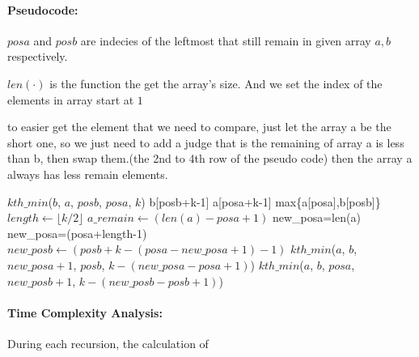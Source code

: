 \begin{parts}
\begin{solution}
\begin{enumerate}
        
        \end{enumerate}

        \paragraph{Pseudocode:}
        $posa$ and $posb$ are indecies of the leftmost that still remain in given array $a,b$ respectively.
        
        $len(\cdot)$ is the function the get the array's size.
        And we set the index of the elements in array start at $1$
        
        to easier get the element that we need to compare, just let the array a be the short one,
        so we just need to add a judge that is the remaining of array a is less than b, then swap them.(the 2nd to 4th row of the pseudo code)
        then the array a always has less remain elements.
        
        \begin{algorithm}[H]
          \begin{algorithmic}[1]
            \State \Return $kth\_min$($b$, $a$, $posb$, $posa$, $k$)
            \EndIf
            \State \Return b[posb+k-1]
            \EndIf
            \State \Return a[posa+k-1]
            \EndIf
            \State \Return max\{a[posa],b[posb]\}
            \EndIf
            \State $length\gets \lfloor k/2 \rfloor$
            \State $a\_remain\gets (len(a)-posa+1)$
            \State new\_posa=len(a)
            \Else
            \State new\_posa=(posa+length-1)
            \EndIf
            \State $new\_posb\gets(posb+k-(posa-new\_posa+1)-1)$
            \State \Return $kth\_min$($a$, $b$, $new\_posa+1$, $posb$, $k-(new\_posa-posa+1)$) 		
            \Else
            \State \Return $kth\_min$($a$, $b$, $posa$, $new\_posb+1$, $k-(new\_posb-posb+1)$) 		
            \EndIf
            \EndFunction
          \end{algorithmic}
        \end{algorithm}

        \paragraph{Time Complexity Analysis:}
        During each recursion, the calculation of
        

\end{solution}
\end{parts}
